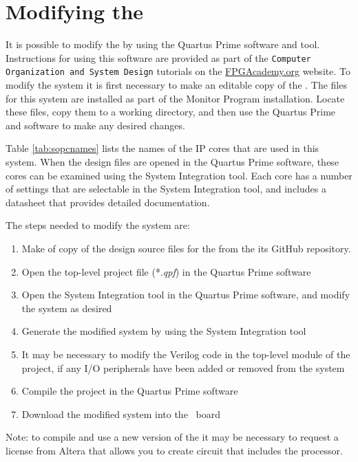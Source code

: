 \section{Modifying the \systemNameFull}

It is possible to modify the {\it \systemNameFull} 
by using the Quartus\textsuperscript{\textregistered} Prime software
and {\systemBuilder} tool. Instructions for using this software are
provided as part of the
\texttt{Computer Organization and System Design} tutorials on the 
{\small \href{https://www.fpgacademy.org/tutorials.html} {FPGAcademy.org}} website.
To modify the system it is first necessary to make an editable copy of the 
{\it \systemNameFull}. The files for this system are installed as part of the Monitor 
Program installation. Locate these files, copy them to a working directory, and then 
use the Quartus Prime and {\systemBuilder} software to make any desired changes.

Table \ref{tab:sopcnames} lists the names of the {\systemBuilder} IP cores that are used 
in this system. When the {\it \systemNameFull} design files are opened in the Quartus 
Prime software, these cores can be examined using the {\systemBuilder} System Integration 
tool.  Each core has a number of settings that are selectable in the {\systemBuilder} 
System Integration tool, and includes a datasheet that provides detailed documentation.

The steps needed to modify the system are:

\begin{enumerate}
\item Make of copy of the design source files for the {\it \systemNameFull} from the its 
GitHub repository. 
\item Open the top-level project file (*.{\it qpf}) in the Quartus Prime software
\item Open the {\systemBuilder} System Integration tool in the Quartus Prime software, and 
modify the system as desired
\item Generate the modified system by using the {\systemBuilder} System Integration tool
\item It may be necessary to modify the Verilog code in the top-level module of the project, 
if any I/O peripherals have been added or removed from the system
\item Compile the project in the Quartus Prime software
\item Download the modified system into the \DEBoard~board
\end{enumerate}

Note: to compile and use a new version of the {\it \systemNameFull} it may be necessary to
request a license from Altera that allows you to create circuit that includes 
the {\processor} processor.

